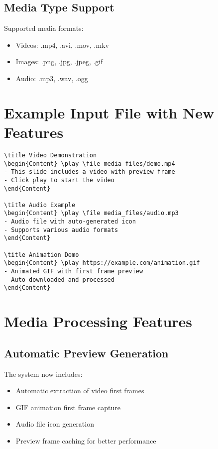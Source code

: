\documentclass{article}
\begin{document}
\subsection{Media Type Support}
Supported media formats:
\begin{tcolorbox}[title=Supported Formats]
\begin{itemize}
    \item Videos: .mp4, .avi, .mov, .mkv
    \item Images: .png, .jpg, .jpeg, .gif
    \item Audio: .mp3, .wav, .ogg
\end{itemize}
\end{tcolorbox}

\section{Example Input File with New Features}
\begin{tcolorbox}[enhanced]
\begin{verbatim}
\title Video Demonstration
\begin{Content} \play \file media_files/demo.mp4
- This slide includes a video with preview frame
- Click play to start the video
\end{Content}

\title Audio Example
\begin{Content} \play \file media_files/audio.mp3
- Audio file with auto-generated icon
- Supports various audio formats
\end{Content}

\title Animation Demo
\begin{Content} \play https://example.com/animation.gif
- Animated GIF with first frame preview
- Auto-downloaded and processed
\end{Content}
\end{verbatim}
\end{tcolorbox}

\section{Media Processing Features}
\subsection{Automatic Preview Generation}
The system now includes:
\begin{itemize}
    \item Automatic extraction of video first frames
    \item GIF animation first frame capture
    \item Audio file icon generation
    \item Preview frame caching for better performance
\end{itemize}
\end{document}

